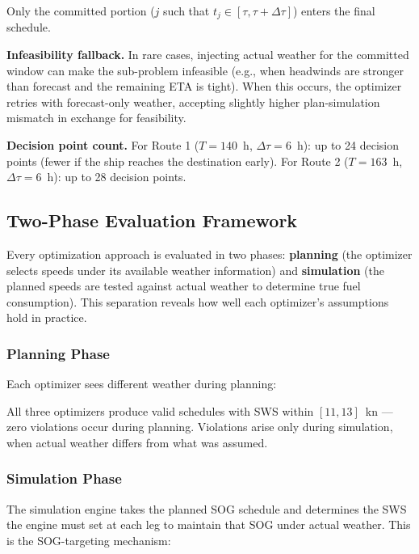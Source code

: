 \documentclass[review]{elsarticle}
\begin{document}
Only the committed portion ($j$ such that $t_j \in [\tau, \tau + \Delta\tau]$) enters the final schedule.

\textbf{Infeasibility fallback.} In rare cases, injecting actual weather for the committed window can make the sub-problem infeasible (e.g., when headwinds are stronger than forecast and the remaining ETA is tight). When this occurs, the optimizer retries with forecast-only weather, accepting slightly higher plan-simulation mismatch in exchange for feasibility.

\textbf{Decision point count.} For Route 1 ($T = 140$~h, $\Delta\tau = 6$~h): up to 24 decision points (fewer if the ship reaches the destination early). For Route 2 ($T = 163$~h, $\Delta\tau = 6$~h): up to 28 decision points.

\subsection{Two-Phase Evaluation Framework}
\label{sec:two-phase}

Every optimization approach is evaluated in two phases: \textbf{planning} (the optimizer selects speeds under its available weather information) and \textbf{simulation} (the planned speeds are tested against actual weather to determine true fuel consumption). This separation reveals how well each optimizer's assumptions hold in practice.

\subsubsection{Planning Phase}

Each optimizer sees different weather during planning:


All three optimizers produce valid schedules with SWS within $[11, 13]$~kn --- zero violations occur during planning. Violations arise only during simulation, when actual weather differs from what was assumed.

\subsubsection{Simulation Phase}

The simulation engine takes the planned SOG schedule and determines the SWS the engine must set at each leg to maintain that SOG under actual weather. This is the SOG-targeting mechanism:
\end{document}
